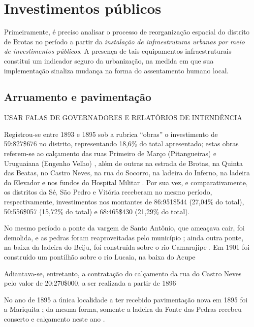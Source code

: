 \section{Investimentos públicos}\label{sec:3.1}

Primeiramente, é preciso analisar o processo de reorganização espacial do distrito de Brotas no período a partir da \textit{instalação de infraestruturas urbanas por meio de investimentos públicos}. A presença de tais equipamentos infraestruturais constitui um indicador seguro da urbanização, na medida em que sua implementação sinaliza mudança na forma do assentamento humano local. 

\subsection{Arruamento e pavimentação}

USAR FALAS DE GOVERNADORES E RELATÓRIOS DE INTENDÊNCIA

Registrou-se entre 1893 e 1895 sob a rubrica ``obras'' o investimento de 59:827\$676 no distrito, representando 18,6\% do total apresentado;  estas obras referem-se ao calçamento das ruas Primeiro de Março (Pitangueiras) e Uruguaiana (Engenho Velho) \cite[pp.~21-23, 138]{salvador_relatorio_1896}, além de outras na estrada de Brotas, na Quinta das Beatas, no Castro Neves, na rua do Socorro, na ladeira do Inferno, na ladeira do Elevador e nos fundos do Hospital Militar \cite[p.~157]{salvador_relatorio_1894}. Por sua vez, e comparativamente, os distritos da Sé, São Pedro e Vitória receberam no mesmo período, respectivamente, investimentos nos montantes de 86:951\$544 (27,04\% do total), 50:556\$057 (15,72\% do total) e 68:465\$430 (21,29\% do total).

No mesmo período a ponte da vargem de Santo Antônio, que ameaçava cair, foi demolida, e as pedras foram reaproveitadas pelo município \cite[p.~137]{salvador_relatorio_1896}; ainda outra ponte, na baixa da ladeira do Beiju, foi construída sobre o rio Camarajipe \cite[p.~156]{salvador_relatorio_1894}. Em 1901 foi construído um pontilhão sobre o rio Lucaia, na baixa do Acupe 

Adiantava-se, entretanto, a contratação do calçamento da rua do Castro Neves pelo valor de 20:270\$000, a ser realizada a partir de 1896 \cite[p.~23]{salvador_relatorio_1896}

No ano de 1895 a única localidade a ter recebido pavimentação nova em 1895 foi a Mariquita \cite[p.~16]{salvador_relatorio_1896}; da mesma forma, somente a ladeira da Fonte das Pedras recebeu conserto e calçamento neste ano \cite[p.~16]{salvador_relatorio_1896}. 

